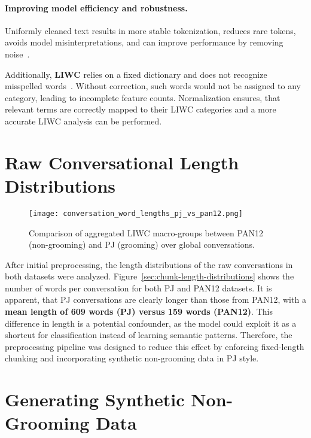 \paragraph{Improving model efficiency and robustness.}  
Uniformly cleaned text results in more stable tokenization, reduces rare tokens, avoids model misinterpretations, and can improve performance by removing noise~\cite{sun-etal-2023-tokenization}.

Additionally, \textbf{LIWC} relies on a fixed dictionary and does not recognize misspelled words~\cite{pennebaker2022liwc}. Without correction, such words would not be assigned to any category, leading to incomplete feature counts. Normalization ensures, that relevant terms are correctly mapped to their LIWC categories and a more accurate LIWC analysis can be performed.

\section{Raw Conversational Length Distributions }

\begin{figure}[H]
    \centering
    \texttt{[image: conversation\_word\_lengths\_pj\_vs\_pan12.png]}
    \caption[Comparison of LIWC macro-groups]{Comparison of aggregated LIWC macro-groups between PAN12 (non-grooming) and PJ (grooming) over global conversations.}
    \label{fig:conversation_word_lengths}
\end{figure}

After initial preprocessing, the length distributions of the raw conversations in both datasets were analyzed. Figure~\ref{sec:chunk-length-distributions} shows the number of words per conversation for both PJ and PAN12 datasets. It is apparent, that PJ conversations are clearly longer than those from PAN12, with a \textbf{mean length of 609 words (PJ) versus 159 words (PAN12)}. This difference in length is a potential confounder, as the model could exploit it as a shortcut for classification instead of learning semantic patterns. Therefore, the preprocessing pipeline was designed to reduce this effect by enforcing fixed-length chunking and incorporating synthetic non-grooming data in PJ style.


\section{Generating Synthetic Non-Grooming Data}\label{sec:synthetic-data}

